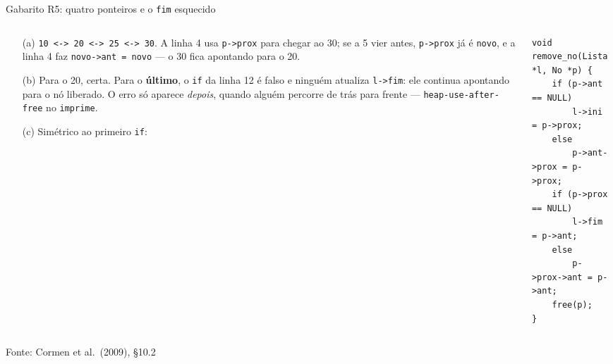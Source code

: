 \documentclass[aspectratio=169]{beamer}
\newcommand{\fonte}[1]{\vfill\hfill{\scriptsize\textcolor{UFSGray}{Fonte: #1}}}
\begin{document}
\begin{frame}[fragile]{Gabarito R5: quatro ponteiros e o \texttt{fim} esquecido}
  \begin{columns}[T]
    \begin{column}{0.54\textwidth}
      \scriptsize
      \begin{enumerate}
        \item[(a)] \texttt{10 <-> 20 <-> 25 <-> 30}. A linha 4 usa
          \texttt{p->prox} para chegar ao 30; se a 5 vier antes,
          \texttt{p->prox} já é \texttt{novo}, e a linha 4 faz
          \texttt{novo->ant = novo} --- o 30 fica apontando para o 20.
        \item[(b)] Para o 20, certa. Para o \textbf{último}, o
          \texttt{if} da linha 12 é falso e ninguém atualiza
          \texttt{l->fim}: ele continua apontando para o nó liberado. O
          erro só aparece \emph{depois}, quando alguém percorre de trás para
          frente --- \texttt{heap-use-after-free} no \texttt{imprime}.
        \item[(c)] Simétrico ao primeiro \texttt{if}:
      \end{enumerate}
    \end{column}
    \begin{column}{0.42\textwidth}
\begin{lstlisting}[style=tinyC]
void remove_no(Lista *l, No *p) {
    if (p->ant == NULL)
        l->ini = p->prox;
    else
        p->ant->prox = p->prox;
    if (p->prox == NULL)
        l->fim = p->ant;
    else
        p->prox->ant = p->ant;
    free(p);
}
\end{lstlisting}
    \end{column}
  \end{columns}
  \fonte{Cormen et al.\ (2009), §10.2~\cite{cormen2009introduction}}
\end{frame}
\end{document}

